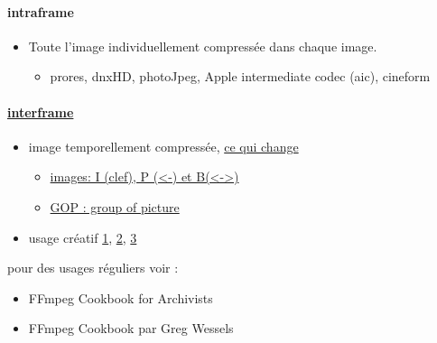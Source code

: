 \documentclass[
]{book}
\providecommand{\tightlist}{%
  \setlength{\itemsep}{0pt}\setlength{\parskip}{0pt}}
\begin{document}
\hypertarget{intraframe}{%
\paragraph{intraframe}\label{intraframe}}

\begin{itemize}
\tightlist
\item
  Toute l'image individuellement compressée dans chaque image.

  \begin{itemize}
  \tightlist
  \item
    prores, dnxHD, photoJpeg, Apple intermediate codec (aic), cineform
  \end{itemize}
\end{itemize}

\hypertarget{interframe}{%
\paragraph{\texorpdfstring{\href{https://en.wikipedia.org/wiki/Inter_frame}{interframe}}{interframe}}\label{interframe}}

\begin{itemize}
\tightlist
\item
  image temporellement compressée, \href{http://dvd-hq.info/data_compression_3.php}{ce qui change}

  \begin{itemize}
  \tightlist
  \item
    \href{https://en.wikipedia.org/wiki/Video_compression_picture_types}{images: I (clef), P (\textless-) et B(\textless-\textgreater)}
  \item
    \href{https://en.wikipedia.org/wiki/Inter_frame\#/media/File:IPB_images_sequence.png}{GOP : group of picture}
  \end{itemize}
\item
  usage créatif \href{https://www.youtube.com/watch?v=rMSsw4CZvKg}{1}, \href{https://www.youtube.com/watch?v=rSmEOk5AiN0}{2}, \href{https://www.youtube.com/watch?v=dNa0-xrKi3Q}{3}
\end{itemize}

pour des usages réguliers voir :

\begin{itemize}
\tightlist
\item
  FFmpeg Cookbook for Archivists \citep{kromer_FFmpegCookbookArchivists_2020}
\item
  FFmpeg Cookbook par Greg Wessels \citep{wessels_FFmpegCookbook_2017}
\end{itemize}
\end{document}
